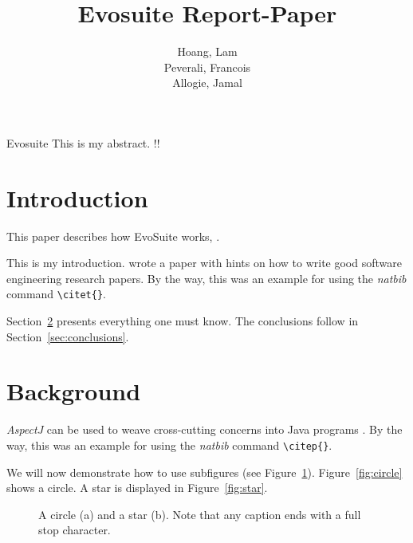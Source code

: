 \documentclass[pdftex,english,oribibl]{llncs}
\title{Evosuite Report-Paper}
\author{Hoang, Lam\\ Peverali, Francois \\ Allogie, Jamal}
\institute{Humboldt University of Berlin\\Department of Computer Science\\12489 Berlin, Germany}
\makeatletter
\gdef\@keywords{}
\renewenvironment{abstract}{%
  \list{}{\advance\topsep by0.35cm\relax\small%
          \leftmargin=1cm%
          \labelwidth=\z@%
          \listparindent=\z@%
          \itemindent\listparindent%
          \rightmargin\leftmargin}%
          \item[\hskip\labelsep\bfseries\abstractname]}{%
  \if!\@keywords!\else{\item[~]\item[\hskip\labelsep\bfseries\keywordname]\@keywords}\fi%
  \endlist}
\makeatother
\begin{document}
\maketitle

\begin{abstract}
  Evosuite This is my abstract.
\end{abstract}

\section{Introduction}

This paper describes how EvoSuite works, \citet{fraser2011evosuite}.

This is my introduction. \citet{Shaw2003WritingGoodSoftwareEngineeringResearchPapersMinitutorial} wrote a paper with hints on how to write good software engineering research papers. By the way, this was an example for using the \textit{natbib} command \texttt{\textbackslash{}citet\{\}}.

  Section~\ref{sec:anotherSection} presents everything one must know. The conclusions follow in Section~\ref{sec:conclusions}.

\section{Background}\label{sec:anotherSection}



  \textit{AspectJ} can be used to weave cross-cutting concerns into Java programs \citep{AspectJ2007}. By the way, this was an example for using the \textit{natbib} command \texttt{\textbackslash{}citep\{\}}.

  We will now demonstrate how to use subfigures (see Figure~\ref{fig:subfig}). Figure~\ref{fig:circle} shows a circle. A star is displayed in Figure~\ref{fig:star}.

  \begin{figure}
    \centering
    \caption{A circle (a) and a star (b). Note that any caption ends with a full stop character.}
    \label{fig:subfig}
  \end{figure}
\end{document}
